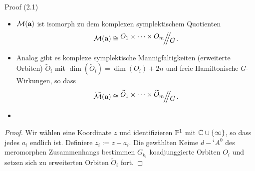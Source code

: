 \begin{ex}
Proof (2.1)
\end{ex}
\begin{prop}
\begin{itemize}
\item
{}
$\mathcal M(\textbf a)$ ist isomorph zu dem komplexen symplektischem Quotienten
\[
\mathcal M(\textbf a)\cong\symplquot{O_1\times\cdots\times O_m}{G} \,.
\]
\item
{}
Analog gibt es komplexe symplektische Mannigfaltigkeiten (erweiterte Orbiten)
$\tilde O_i$ mit $\dim(\tilde O_i)=\dim(O_i)+2n$ und freie Hamiltonische
$G$-Wirkungen, so dass
\[
\widetilde{\mathcal M}(\textbf a)\cong
\symplquot{\tilde O_1\times\cdots\times\tilde O_m}{G} \,.
\]
\item \TODO[Unterpunkt 3]
\end{itemize}
\end{prop}
\begin{proof}
Wir wählen eine Koordinate $z$ und identifizieren $\P^1$ mit
$\C\cup\{\infty\}$, so dass jedes $a_i$ endlich ist.
Definiere $z_i:=z-a_i$.
Die gewählten Keime $d-{{}^i}A^0$ des meromorphen Zusammenhangs bestimmen
$G_{k_i}$ koadjunggierte Orbiten $O_i$ und setzen sich zu erweiterten Orbiten
$\tilde O_i$ fort.
\begin{comment}
Setze $O_i$ als den koadjunggierten Orbit durch den Punkt von $\mathfrak
g_k^*$, welcher durch den Hauptteil von ${}^iA^0$ \comm{~in (5)~} gegeben ist.
Analog bestimmt der irreguläre Teil von ${}^iA^0$ einen Punkt in $\mathfrak
b_{k_i}^*$ und $\tilde O_i$ ist der erwieterte Orbit assoziiert zu dem
$B_{k_i}$ koadjunggierten Orbit durch den Punkt
\end{comment}
\end{proof}

